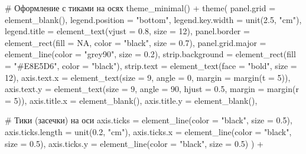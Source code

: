 \documentclass[
  letterpaper,
  DIV=11,
  numbers=noendperiod]{scrreprt}
\newenvironment{Shaded}{\begin{snugshade}}{\end{snugshade}}
\newcommand{\AttributeTok}[1]{\textcolor[rgb]{0.40,0.45,0.13}{#1}}
\newcommand{\CommentTok}[1]{\textcolor[rgb]{0.37,0.37,0.37}{#1}}
\newcommand{\ConstantTok}[1]{\textcolor[rgb]{0.56,0.35,0.01}{#1}}
\newcommand{\DecValTok}[1]{\textcolor[rgb]{0.68,0.00,0.00}{#1}}
\newcommand{\FloatTok}[1]{\textcolor[rgb]{0.68,0.00,0.00}{#1}}
\newcommand{\FunctionTok}[1]{\textcolor[rgb]{0.28,0.35,0.67}{#1}}
\newcommand{\NormalTok}[1]{\textcolor[rgb]{0.00,0.23,0.31}{#1}}
\newcommand{\SpecialCharTok}[1]{\textcolor[rgb]{0.37,0.37,0.37}{#1}}
\newcommand{\StringTok}[1]{\textcolor[rgb]{0.13,0.47,0.30}{#1}}
\begin{document}
\begin{Shaded}
\begin{Highlighting}[]
  \CommentTok{\# Оформление с тиками на осях}
  \FunctionTok{theme\_minimal}\NormalTok{() }\SpecialCharTok{+}
  \FunctionTok{theme}\NormalTok{(}
    \AttributeTok{panel.grid =} \FunctionTok{element\_blank}\NormalTok{(),}
    \AttributeTok{legend.position =} \StringTok{"bottom"}\NormalTok{,}
    \AttributeTok{legend.key.width =} \FunctionTok{unit}\NormalTok{(}\FloatTok{2.5}\NormalTok{, }\StringTok{"cm"}\NormalTok{),}
    \AttributeTok{legend.title =} \FunctionTok{element\_text}\NormalTok{(}\AttributeTok{vjust =} \FloatTok{0.8}\NormalTok{, }\AttributeTok{size =} \DecValTok{12}\NormalTok{),}
    \AttributeTok{panel.border =} \FunctionTok{element\_rect}\NormalTok{(}\AttributeTok{fill =} \ConstantTok{NA}\NormalTok{, }\AttributeTok{color =} \StringTok{"black"}\NormalTok{, }\AttributeTok{size =} \FloatTok{0.7}\NormalTok{),}
    \AttributeTok{panel.grid.major =} \FunctionTok{element\_line}\NormalTok{(}\AttributeTok{color =} \StringTok{"grey90"}\NormalTok{, }\AttributeTok{size =} \FloatTok{0.2}\NormalTok{),}
    \AttributeTok{strip.background =} \FunctionTok{element\_rect}\NormalTok{(}\AttributeTok{fill =} \StringTok{"\#E8E5D6"}\NormalTok{, }\AttributeTok{color =} \StringTok{"black"}\NormalTok{),}
    \AttributeTok{strip.text =} \FunctionTok{element\_text}\NormalTok{(}\AttributeTok{face =} \StringTok{"bold"}\NormalTok{, }\AttributeTok{size =} \DecValTok{12}\NormalTok{),}
    \AttributeTok{axis.text.x =} \FunctionTok{element\_text}\NormalTok{(}\AttributeTok{size =} \DecValTok{9}\NormalTok{, }\AttributeTok{angle =} \DecValTok{0}\NormalTok{, }\AttributeTok{margin =} \FunctionTok{margin}\NormalTok{(}\AttributeTok{t =} \DecValTok{5}\NormalTok{)),}
    \AttributeTok{axis.text.y =} \FunctionTok{element\_text}\NormalTok{(}\AttributeTok{size =} \DecValTok{9}\NormalTok{, }\AttributeTok{angle =} \DecValTok{90}\NormalTok{, }\AttributeTok{hjust =} \FloatTok{0.5}\NormalTok{, }\AttributeTok{margin =} \FunctionTok{margin}\NormalTok{(}\AttributeTok{r =} \DecValTok{5}\NormalTok{)),}
    \AttributeTok{axis.title.x =} \FunctionTok{element\_blank}\NormalTok{(),}
    \AttributeTok{axis.title.y =} \FunctionTok{element\_blank}\NormalTok{(),}
    
    \CommentTok{\# Тики (засечки) на оси}
    \AttributeTok{axis.ticks =} \FunctionTok{element\_line}\NormalTok{(}\AttributeTok{color =} \StringTok{"black"}\NormalTok{, }\AttributeTok{size =} \FloatTok{0.5}\NormalTok{),}
    \AttributeTok{axis.ticks.length =} \FunctionTok{unit}\NormalTok{(}\FloatTok{0.2}\NormalTok{, }\StringTok{"cm"}\NormalTok{),}
    \AttributeTok{axis.ticks.x =} \FunctionTok{element\_line}\NormalTok{(}\AttributeTok{color =} \StringTok{"black"}\NormalTok{, }\AttributeTok{size =} \FloatTok{0.5}\NormalTok{),}
    \AttributeTok{axis.ticks.y =} \FunctionTok{element\_line}\NormalTok{(}\AttributeTok{color =} \StringTok{"black"}\NormalTok{, }\AttributeTok{size =} \FloatTok{0.5}\NormalTok{)}
\NormalTok{  ) }\SpecialCharTok{+}
  

\end{Highlighting}
\end{Shaded}
\end{document}
